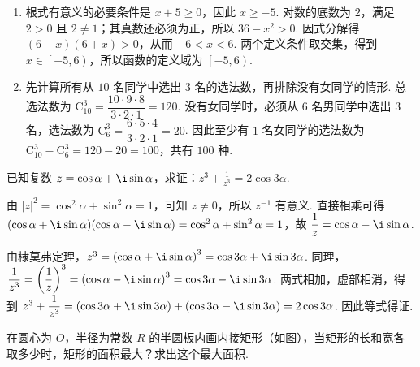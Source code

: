 \begin{solution}
\begin{enumerate}
\item 根式有意义的必要条件是 \(x+5\geq0\)，因此 \(x\geq-5\). 对数的底数为 \(2\)，满足 \(2>0\) 且 \(2\ne1\)；其真数还必须为正，所以 \(36-x^2>0\). 因式分解得 \((6-x)(6+x)>0\)，从而 \(-6<x<6\). 两个定义条件取交集，得到 \(x\in\left[-5,6\right)\)，所以函数的定义域为 \(\left[-5,6\right)\).

\item 先计算所有从 \(10\) 名同学中选出 \(3\) 名的选法数，再排除没有女同学的情形. 总选法数为 \(\mathrm C_{10}^{3}=\dfrac{10\cdot9\cdot8}{3\cdot2\cdot1}=120\). 没有女同学时，必须从 \(6\) 名男同学中选出 \(3\) 名，选法数为 \(\mathrm C_{6}^{3}=\dfrac{6\cdot5\cdot4}{3\cdot2\cdot1}=20\). 因此至少有 \(1\) 名女同学的选法数为 \(\mathrm C_{10}^{3}-\mathrm C_{6}^{3}=120-20=100\)，共有 \(100\) 种.
\end{enumerate}
\end{solution}

\begin{problem}
已知复数 \(z = \cos \alpha + \i\sin \alpha\)，求证：\(z^3 + \frac{1}{z^3} = 2\cos 3\alpha\).
\end{problem}

\begin{solution}
由 \(\left|z\right|^2=\cos^2\alpha+\sin^2\alpha=1\)，可知 \(z\ne0\)，所以 \(z^{-1}\) 有意义. 直接相乘可得 \((\cos\alpha+\i\sin\alpha)(\cos\alpha-\i\sin\alpha)=\cos^2\alpha+\sin^2\alpha=1\)，故 \(\dfrac1z=\cos\alpha-\i\sin\alpha\).

由棣莫弗定理，\(z^3=\left(\cos\alpha+\i\sin\alpha\right)^3=\cos3\alpha+\i\sin3\alpha\). 同理，\(\dfrac1{z^3}=\left(\dfrac1z\right)^3=\left(\cos\alpha-\i\sin\alpha\right)^3=\cos3\alpha-\i\sin3\alpha\). 两式相加，虚部相消，得到 \(z^3+\dfrac1{z^3}=\left(\cos3\alpha+\i\sin3\alpha\right)+\left(\cos3\alpha-\i\sin3\alpha\right)=2\cos3\alpha\). 因此等式得证.
\end{solution}

\begin{problem}
在圆心为 \(O\)，半径为常数 \(R\) 的半圆板内画内接矩形（如图），当矩形的长和宽各取多少时，矩形的面积最大？求出这个最大面积.

\begin{center}
\end{center}
\end{problem}

